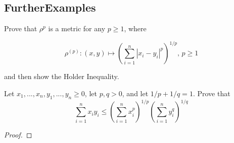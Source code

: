 \subsection{FurtherExamples}

\begin{minorEx}
  Prove that $\rho^{p}$ is a metric for any $p \geq 1$, where

$$\rho^{(p)} : (x,y) \mapsto (\sum_{i=1}^n |x_i - y_i|^p)^{1/p} \text{,   }p\geq 1$$

and then show the Holder Inequality. 

Let $x_1,...,x_n,y_1,...,y_n \geq 0$, let $p,q >0$,
and let $1/p + 1/q =1$. Prove that
$$\sum_{i=1}^n x_iy_i \leq (\sum_{i=1}^n x_i^p)^{1/p} (\sum_{i=1}^ny_i^q)^{1/q}$$
\end{minorEx}

\begin{proof}
  
\end{proof}

